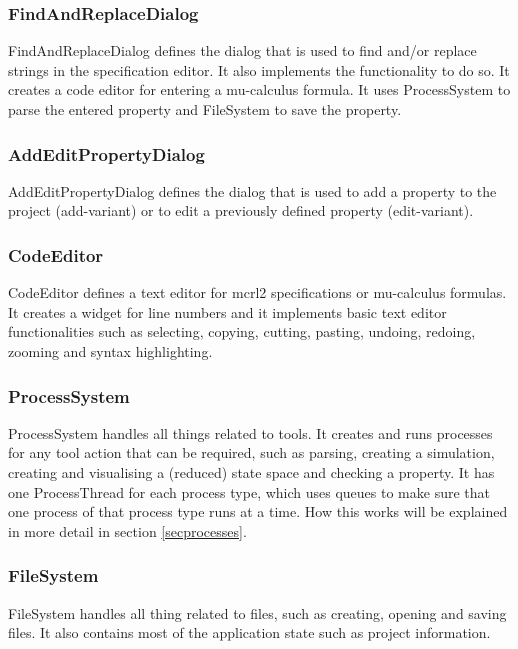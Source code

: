 \documentclass[a4paper, fleqn]{article}
\begin{document}
\subsubsection*{FindAndReplaceDialog}
FindAndReplaceDialog defines the dialog that is used to find and/or replace strings in the specification editor. It also implements the functionality to do so. It creates a code editor for entering a mu-calculus formula. It uses ProcessSystem to parse the entered property and FileSystem to save the property.

\subsubsection*{AddEditPropertyDialog}
AddEditPropertyDialog defines the dialog that is used to add a property to the project (add-variant) or to edit a previously defined property (edit-variant).

\subsubsection*{CodeEditor}
CodeEditor defines a text editor for mcrl2 specifications or mu-calculus formulas. It creates a widget for line numbers and it implements basic text editor functionalities such as selecting, copying, cutting, pasting, undoing, redoing, zooming and syntax highlighting.

\subsubsection*{ProcessSystem}
ProcessSystem handles all things related to tools. It creates and runs processes for any tool action that can be required, such as parsing, creating a simulation, creating and visualising a (reduced) state space and checking a property. It has one ProcessThread for each process type, which uses queues to make sure that one process of that process type runs at a time. How this works will be explained in more detail in section \ref{secprocesses}.

\subsubsection*{FileSystem}
FileSystem handles all thing related to files, such as creating, opening and saving files. It also contains most of the application state such as project information.
\end{document}
